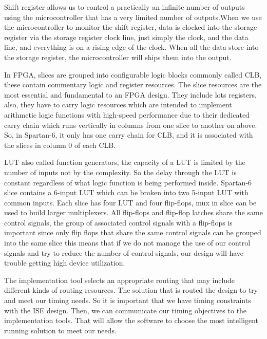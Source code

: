 \documentclass[12pt]{article}
\begin{document}
Shift register allows us to control a practically an infinite number of outputs using the microcontroller that has a very limited number of outputs.When we use the microcontroller to monitor the shift register, data is clocked into the storage register via the storage register clock line, just simply the clock, and the data line, and everything is on a rising edge of the clock. When all the data store into the storage register, the microcontroller will ships them into the output.

In FPGA, slices are grouped into configurable logic blocks commonly called CLB, these contain commentary logic and register resources. The slice resources are the most essential and fundamental to an FPGA design. They include lots registers, also, they have to carry logic resources which are intended to implement arithmetic logic functions with high-speed performance due to their dedicated carry chain which runs vertically in columns from one slice to another on above. So, in Spartan-6, it only has one carry chain for CLB, and it is associated with the slices in column 0 of each CLB. 

LUT also called function generators, the capacity of a LUT is limited by the number of inputs not by the complexity. So the delay through the LUT is constant regardless of what logic function is being performed inside.
Spartan-6 slice contains a 6-input LUT which can be broken into two 5-input LUT with common inputs. Each slice has four LUT and four flip-flops, mux in slice can be used to build larger multiplexers\cite{userguide}.
All flip-flops and flip-flop latches share the same control signals, the group of associated control signals with a flip-flops is important since only flip flops that share the same control signals can be grouped into the same slice this means that if we do not manage the use of our control signals and try to reduce the number of control signals, our design will have trouble getting high device utilization.   

The implementation tool selects an appropriate routing that may include different kinds of routing resources. The solution that is routed the design to try and meet our timing needs. So it is important that we have timing constraints with the ISE design. Then, we can communicate our timing objectives to the implementation tools. That will allow the software to choose the most intelligent running solution to meet our needs.  
\end{document}
